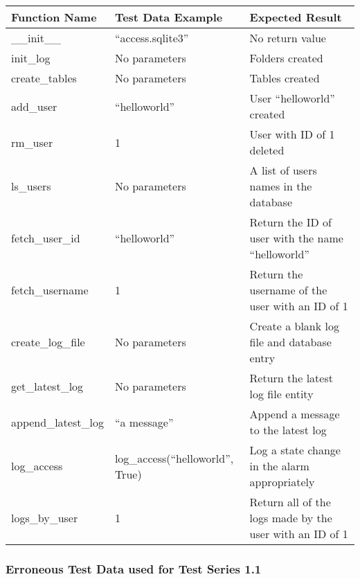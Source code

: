 \documentclass[12pt,a4paper]{report}
\begin{document}
\tablehead{}
\begin{supertabular}{|m{5.097cm}|m{5.099cm}|m{5.1060004cm}|}
\hline
\textbf{Function Name} &
\textbf{Test Data Example} &
\textbf{Expected Result}\\\hline
\_\_init\_\_ &
“access.sqlite3” &
No return value\\\hline
init\_log &
No parameters &
Folders created\\\hline
create\_tables &
No parameters &
Tables created\\\hline
add\_user &
“helloworld” &
User “helloworld” created\\\hline
rm\_user &
1 &
User with ID of 1 deleted\\\hline
ls\_users &
No parameters &
A list of users names in the database\\\hline
fetch\_user\_id &
“helloworld” &
Return the ID of user with the name “helloworld”\\\hline
fetch\_username &
1 &
Return the username of the user with an ID of 1\\\hline
create\_log\_file &
No parameters &
Create a blank log file and database entry\\\hline
get\_latest\_log &
No parameters &
Return the latest log file entity\\\hline
append\_latest\_log &
“a message” &
Append a message to the latest log\\\hline
log\_access &
log\_access(“helloworld”, True) &
Log a state change in the alarm appropriately\\\hline
logs\_by\_user &
1 &
Return all of the logs made by the user with an ID of 1\\\hline
\end{supertabular}

\subsubsection{Erroneous Test Data used for Test Series 1.1}
\end{document}
